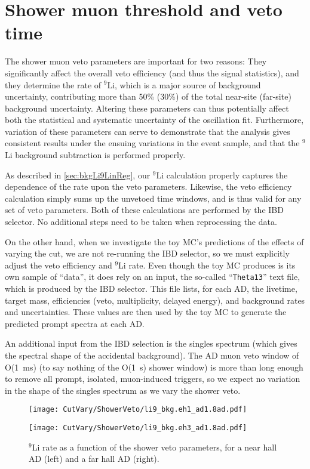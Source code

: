 \documentclass[../thesis.tex]{subfiles}
\begin{document}
\section{Shower muon threshold and veto time}
\label{sec:cutVaryShowerMuon}

The shower muon veto parameters are important for two reasons: They significantly affect the overall veto efficiency (and thus the signal statistics), and they determine the rate of $^9$Li, which is a major source of background uncertainty, contributing more than 50\% (30\%) of the total near-site (far-site) background uncertainty. Altering these parameters can thus potentially affect both the statistical and systematic uncertainty of the oscillation fit. Furthermore, variation of these parameters can serve to demonstrate that the analysis gives consistent results under the ensuing variations in the event sample, and that the $^9$Li background subtraction is performed properly.

As described in \autoref{sec:bkgLi9LinReg}, our $^9$Li calculation properly captures the dependence of the rate upon the veto parameters. Likewise, the veto efficiency calculation simply sums up the unvetoed time windows, and is thus valid for any set of veto parameters. Both of these calculations are performed by the IBD selector. No additional steps need to be taken when reprocessing the data.

On the other hand, when we investigate the toy MC's predictions of the effects of varying the cut, we are not re-running the IBD selector, so we must explicitly adjust the veto efficiency and $^9$Li rate. Even though the toy MC produces is its own sample of ``data'', it does rely on an input, the so-called ``\texttt{Theta13}'' text file, which is produced by the IBD selector. This file lists, for each AD, the livetime, target mass, efficiencies (veto, multiplicity, delayed energy), and background rates and uncertainties. These values are then used by the toy MC to generate the predicted prompt spectra at each AD\@.

An additional input from the IBD selection is the singles spectrum (which gives the spectral shape of the accidental background). The AD muon veto window of O(1~ms) (to say nothing of the O(1~s) shower window) is more than long enough to remove all prompt, isolated, muon-induced triggers, so we expect no variation in the shape of the singles spectrum as we vary the shower veto.

\begin{figure}[ht]
  \begin{minipage}{0.5\linewidth}%
    \texttt{[image: CutVary/ShowerVeto/li9\_bkg.eh1\_ad1.8ad.pdf]}%
  \end{minipage}%
  \begin{minipage}{0.5\linewidth}%
    \texttt{[image: CutVary/ShowerVeto/li9\_bkg.eh3\_ad1.8ad.pdf]}%
  \end{minipage}%
  \caption{$^9$Li rate as a function of the shower veto parameters, for a near hall AD (left) and a far hall AD (right).}
  \label{fig:cutVaryVetoEffLi9Rates}
\end{figure}
\end{document}
